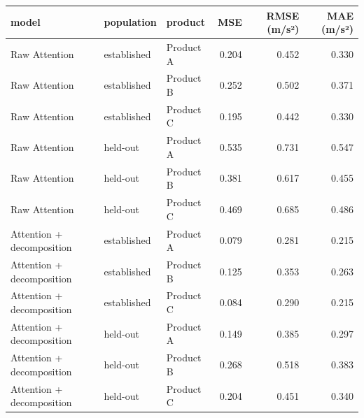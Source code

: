 \begin{tabular}{lllrrr}
\toprule
model & population & product & MSE & RMSE (m/s²) & MAE (m/s²) \\
\midrule
Raw Attention & established & Product A & 0.204 & 0.452 & 0.330 \\
Raw Attention & established & Product B & 0.252 & 0.502 & 0.371 \\
Raw Attention & established & Product C & 0.195 & 0.442 & 0.330 \\
Raw Attention & held-out & Product A & 0.535 & 0.731 & 0.547 \\
Raw Attention & held-out & Product B & 0.381 & 0.617 & 0.455 \\
Raw Attention & held-out & Product C & 0.469 & 0.685 & 0.486 \\
Attention + decomposition & established & Product A & 0.079 & 0.281 & 0.215 \\
Attention + decomposition & established & Product B & 0.125 & 0.353 & 0.263 \\
Attention + decomposition & established & Product C & 0.084 & 0.290 & 0.215 \\
Attention + decomposition & held-out & Product A & 0.149 & 0.385 & 0.297 \\
Attention + decomposition & held-out & Product B & 0.268 & 0.518 & 0.383 \\
Attention + decomposition & held-out & Product C & 0.204 & 0.451 & 0.340 \\
\bottomrule
\end{tabular}
